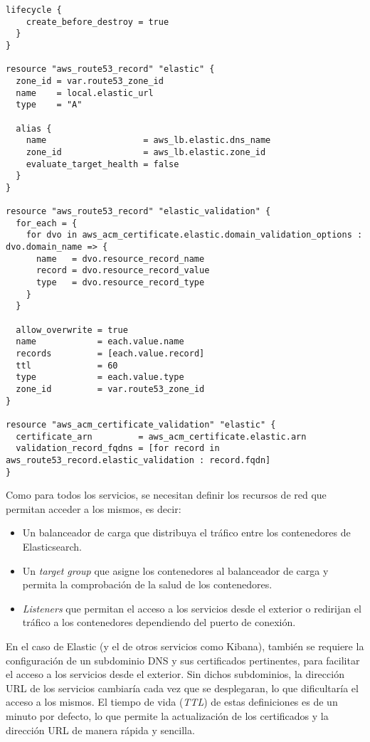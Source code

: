 \begin{lstlisting}[caption={Definción de recursos de Elastic}, label={lst:elastic_resources}]
  lifecycle {
    create_before_destroy = true
  }
}

resource "aws_route53_record" "elastic" {
  zone_id = var.route53_zone_id
  name    = local.elastic_url
  type    = "A"

  alias {
    name                   = aws_lb.elastic.dns_name
    zone_id                = aws_lb.elastic.zone_id
    evaluate_target_health = false
  }
}

resource "aws_route53_record" "elastic_validation" {
  for_each = {
    for dvo in aws_acm_certificate.elastic.domain_validation_options : dvo.domain_name => {
      name   = dvo.resource_record_name
      record = dvo.resource_record_value
      type   = dvo.resource_record_type
    }
  }

  allow_overwrite = true
  name            = each.value.name
  records         = [each.value.record]
  ttl             = 60
  type            = each.value.type
  zone_id         = var.route53_zone_id
}

resource "aws_acm_certificate_validation" "elastic" {
  certificate_arn         = aws_acm_certificate.elastic.arn
  validation_record_fqdns = [for record in aws_route53_record.elastic_validation : record.fqdn]
}
\end{lstlisting}

Como para todos los servicios, se necesitan definir los recursos de red que
permitan acceder a los mismos, es decir:

\begin{itemize}
	\item Un balanceador de carga que distribuya el tráfico entre los
		contenedores de Elasticsearch.
	\item Un \textit{target group} que asigne los contenedores al balanceador de
		carga y permita la comprobación de la salud de los contenedores.
	\item \textit{Listeners} que permitan el acceso a los servicios desde el
		exterior o redirijan el tráfico a los contenedores dependiendo del
		puerto de conexión.
\end{itemize}

En el caso de Elastic (y el de otros servicios como Kibana), también se requiere
la configuración de un subdominio DNS y sus certificados pertinentes, para
facilitar el acceso a los servicios desde el exterior. Sin dichos subdominios,
la dirección URL de los servicios cambiaría cada vez que se desplegaran, lo que
dificultaría el acceso a los mismos. El tiempo de vida (\textit{TTL}) de estas
definiciones es de un minuto por defecto, lo que permite la actualización de
los certificados y la dirección URL de manera rápida y sencilla.
